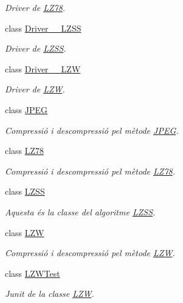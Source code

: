 \begin{DoxyCompactItemize}
\begin{DoxyCompactList}\small\item\em Driver de \hyperlink{classdomini_1_1algorithm_1_1LZ78}{L\+Z78}. \end{DoxyCompactList}\item 
class \hyperlink{classdomini_1_1algorithm_1_1Driver____LZSS}{Driver\+\_\+\+\_\+\+L\+Z\+SS}
\begin{DoxyCompactList}\small\item\em Driver de \hyperlink{classdomini_1_1algorithm_1_1LZSS}{L\+Z\+SS}. \end{DoxyCompactList}\item 
class \hyperlink{classdomini_1_1algorithm_1_1Driver____LZW}{Driver\+\_\+\+\_\+\+L\+ZW}
\begin{DoxyCompactList}\small\item\em Driver de \hyperlink{classdomini_1_1algorithm_1_1LZW}{L\+ZW}. \end{DoxyCompactList}\item 
class \hyperlink{classdomini_1_1algorithm_1_1JPEG}{J\+P\+EG}
\begin{DoxyCompactList}\small\item\em Compressió i descompressió pel mètode \hyperlink{classdomini_1_1algorithm_1_1JPEG}{J\+P\+EG}. \end{DoxyCompactList}\item 
class \hyperlink{classdomini_1_1algorithm_1_1LZ78}{L\+Z78}
\begin{DoxyCompactList}\small\item\em Compressió i descompressió pel mètode \hyperlink{classdomini_1_1algorithm_1_1LZ78}{L\+Z78}. \end{DoxyCompactList}\item 
class \hyperlink{classdomini_1_1algorithm_1_1LZSS}{L\+Z\+SS}
\begin{DoxyCompactList}\small\item\em Aquesta és la classe del algoritme \hyperlink{classdomini_1_1algorithm_1_1LZSS}{L\+Z\+SS}. \end{DoxyCompactList}\item 
class \hyperlink{classdomini_1_1algorithm_1_1LZW}{L\+ZW}
\begin{DoxyCompactList}\small\item\em Compressió i descompressió pel mètode \hyperlink{classdomini_1_1algorithm_1_1LZW}{L\+ZW}. \end{DoxyCompactList}\item 
class \hyperlink{classdomini_1_1algorithm_1_1LZWTest}{L\+Z\+W\+Test}
\begin{DoxyCompactList}\small\item\em Junit de la classe \hyperlink{classdomini_1_1algorithm_1_1LZW}{L\+ZW}. \end{DoxyCompactList}\end{DoxyCompactItemize}
